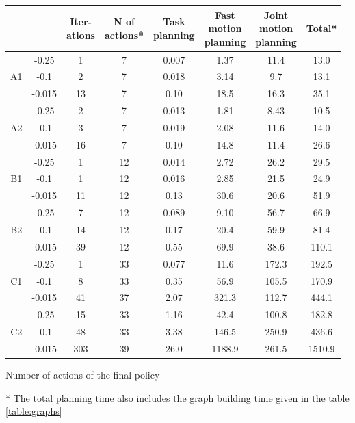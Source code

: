 \documentclass[conference]{IEEEtran}
\begin{document}
\begin{center}
\footnotesize
\setlength\tabcolsep{3pt} %
\begin{tabular}{|c|c|c|c|c|c|c|c|}
\hline
                  			   & \thead{$R_0$} & \thead{Iter-\\ations} & \thead{N of\\actions*} & \thead{Task\\planning} & \thead{Fast\\motion\\planning} & \thead{Joint\\motion\\planning} & Total*\\
\hline
\multirow{3}{*}{A1}     & -0.25  & 1 & 7 & 0.007 & 1.37 & 11.4 & 13.0 \\
				        & -0.1   & 2 & 7 & 0.018 & 3.14 & 9.7  & 13.1 \\
					    & -0.015 & 13 & 7 & 0.10  & 18.5 & 16.3 & 35.1 \\
\hline
\multirow{3}{*}{A2}     & -0.25  & 2 & 7 & 0.013 & 1.81 & 8.43 & 10.5 \\
				        & -0.1   & 3 & 7 & 0.019 & 2.08 & 11.6 & 14.0 \\
					    & -0.015 & 16 & 7 & 0.10 & 14.8 & 11.4 & 26.6 \\
\hline
\multirow{3}{*}{B1}     & -0.25  & 1 & 12 & 0.014 & 2.72 & 26.2 & 29.5 \\
				        & -0.1   & 1 & 12 & 0.016 & 2.85 & 21.5 & 24.9 \\
					    & -0.015 & 11 & 12 & 0.13 & 30.6 & 20.6 & 51.9 \\
					    
\hline
\multirow{3}{*}{B2}     & -0.25  & 7 & 12 & 0.089 & 9.10 & 56.7 & 66.9 \\
				        & -0.1   & 14 & 12 & 0.17 & 20.4 & 59.9 & 81.4 \\
					    & -0.015 & 39 & 12 & 0.55 & 69.9 & 38.6 & 110.1 \\
\hline
\multirow{3}{*}{C1}     & -0.25  & 1 & 33 & 0.077 & 11.6 & 172.3 & 192.5 \\
				        & -0.1   & 8 & 33 & 0.35 & 56.9 & 105.5 & 170.9 \\
					    & -0.015 & 41 & 37 & 2.07 & 321.3 & 112.7 & 444.1\\
\hline
\multirow{3}{*}{C2}     & -0.25  & 15 & 33 & 1.16 & 42.4 & 100.8 & 182.8 \\
				        & -0.1   & 48 & 33 & 3.38 & 146.5 & 250.9 & 436.6 \\
					    & -0.015 & 303 & 39 & 26.0 & 1188.9 & 261.5 & 1510.9 \\
\hline
\end{tabular}
\begin{tablenotes}
      \footnotesize
      \item * Number of actions of the final policy
      \item ** The total planning time also includes the graph building time given in the table \ref{table:graphs}
    \end{tablenotes}
    
\label{table:times}
\end{center}
\end{document}
